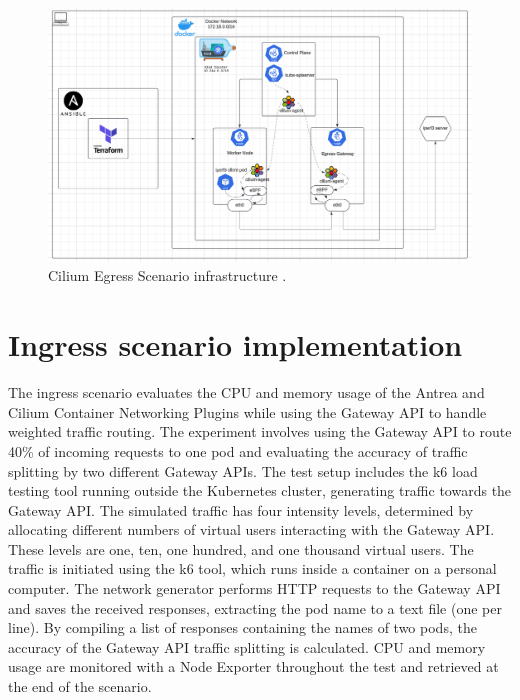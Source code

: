 \begin{figure}[H]
  \centering
  \includegraphics[width=1\columnwidth]{images/cilium_egress_gatateway_cluster.png}
  \caption{Cilium Egress Scenario infrastructure \cite{K8sIcons}\cite{LucidApp}\cite{CiliumEgressGateway}\cite{CiliumComponents}\cite{TerraformIcon}\cite{AnsibleIcon}\cite{KindIcon}\cite{DockerIcon}.}
  \label{fig:ciliumEgressGatewayScenarioArch}
\end{figure}

\section{Ingress scenario implementation}
\label{sec:ingressImpl}

The ingress scenario evaluates the CPU and memory usage of the Antrea and Cilium Container Networking Plugins while using the Gateway API to handle weighted traffic routing. The experiment involves using the Gateway API to route 40\% of incoming requests to one pod and evaluating the accuracy of traffic splitting by two different Gateway APIs. The test setup includes the k6 load testing tool running outside the Kubernetes cluster, generating traffic towards the Gateway API. The simulated traffic has four intensity levels, determined by allocating different numbers of virtual users interacting with the Gateway API. These levels are one, ten, one hundred, and one thousand virtual users. The traffic is initiated using the k6 tool, which runs inside a container on a personal computer. The network generator performs HTTP requests to the Gateway API and saves the received responses, extracting the pod name to a text file (one per line). By compiling a list of responses containing the names of two pods, the accuracy of the Gateway API traffic splitting is calculated. CPU and memory usage are monitored with a Node Exporter throughout the test and retrieved at the end of the scenario.


